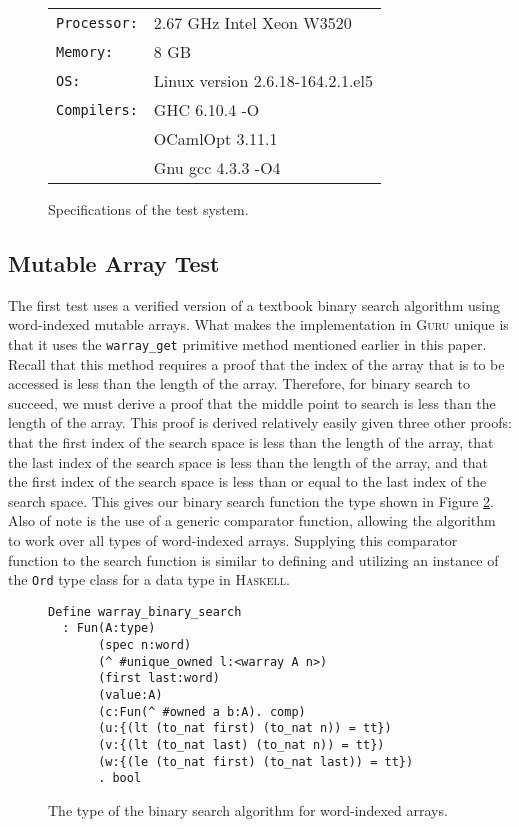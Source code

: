 \documentclass[9pt,natbib]{sigplanconf}
\begin{document}
\begin{figure}
\begin{tabular}{ll}
\texttt{Processor:} & 2.67 GHz Intel Xeon W3520 \\
\texttt{Memory:} & 8 GB \\
\texttt{OS:} & Linux version 2.6.18-164.2.1.el5\\
\texttt{Compilers:} & GHC 6.10.4 -O \\
\ & OCamlOpt 3.11.1 \\
\ & Gnu gcc 4.3.3 -O4
\end{tabular}
\caption{Specifications of the test system.}
\label{teststats}
\end{figure}

\subsection{Mutable Array Test}

The first test uses a verified version of a textbook binary search
algorithm using word-indexed mutable arrays.  What makes the
implementation in \textsc{Guru} unique is that it uses the
\texttt{warray\_get} primitive method mentioned earlier in this paper.
Recall that this method requires a proof that the index of the array
that is to be accessed is less than the length of the array.
Therefore, for binary search to succeed, we must derive a proof that
the middle point to search is less than the length of the array.  This
proof is derived relatively easily given three other proofs: that the
first index of the search space is less than the length of the array,
that the last index of the search space is less than the length of the
array, and that the first index of the search space is less than or
equal to the last index of the search space.  This gives our binary
search function the type shown in Figure \ref{bs}.  Also of note is
the use of a generic comparator function, allowing the algorithm to
work over all types of word-indexed arrays.  Supplying this comparator
function to the search function is similar to defining and utilizing
an instance of the \texttt{Ord} type class for a data type in
\textsc{Haskell}.

\begin{figure}
\begin{verbatim}
Define warray_binary_search
  : Fun(A:type)                                   
       (spec n:word)                              
       (^ #unique_owned l:<warray A n>)           
       (first last:word)                          
       (value:A)                                  
       (c:Fun(^ #owned a b:A). comp)              
       (u:{(lt (to_nat first) (to_nat n)) = tt})  
       (v:{(lt (to_nat last) (to_nat n)) = tt})
       (w:{(le (to_nat first) (to_nat last)) = tt})
       . bool                                     
\end{verbatim}
\caption{The type of the binary search algorithm for word-indexed arrays.}
\label{bs}
\end{figure}
\end{document}
